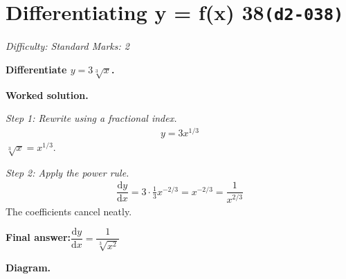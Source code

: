\documentclass[11pt]{article}
\newcommand{\question}[1]{\par\medskip\noindent\textbf{#1}\par}
\begin{document}
\section*{Differentiating y = f(x) 38\quad\small\texttt{(d2-038)}}
\textit{Difficulty: Standard \quad\textbar\quad Marks: 2}

\question{Differentiate \( y = 3\sqrt[3]{x} \).}

\textbf{Worked solution.}

\textit{Step 1: Rewrite using a fractional index.}
\[\begin{gathered}
y = 3x^{1/3}
\end{gathered}\]
\( \sqrt[3]{x} = x^{1/3} \).

\textit{Step 2: Apply the power rule.}
\[\begin{gathered}
\dfrac{\mathrm{d}y}{\mathrm{d}x} = 3 \cdot \tfrac{1}{3} x^{-2/3} = x^{-2/3} = \dfrac{1}{x^{2/3}}
\end{gathered}\]
The coefficients cancel neatly.

\begin{answerbox}
\textbf{Final answer:}\quad \(\displaystyle  \dfrac{\mathrm{d}y}{\mathrm{d}x} = \dfrac{1}{\sqrt[3]{x^2}} \)
\end{answerbox}
\textbf{Diagram.}
\end{document}
